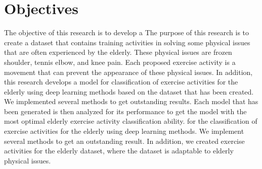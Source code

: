 \section{Objectives}
The objective of this research is to develop a The purpose of this research is to create a dataset that contains training activities in solving some physical issues that are often experienced by the elderly. These physical issues are frozen shoulder, tennis elbow, and knee pain. Each proposed exercise activity is a movement that can prevent the appearance of these physical issues. In addition, this research develops a model for classification of exercise activities for the elderly using deep learning methods based on the dataset that has been created. We implemented several methods to get outstanding results. Each model that has been generated is then analyzed for its performance to get the model with the most optimal elderly exercise activity classification ability. for the classification of exercise activities for the elderly using deep learning methods. We implement several methods to get an outstanding result. In addition, we created exercise activities for the elderly dataset, where the dataset is adaptable to elderly physical issues.

